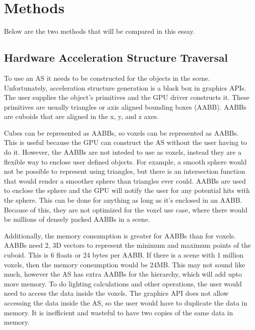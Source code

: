 \documentclass[12pt]{article}
\begin{document}

\section{Methods}

Below are the two methods that will be compared in this essay.

\subsection{Hardware Acceleration Structure Traversal}

To use an AS it needs to be constructed for the objects in the scene.
Unfortunately, acceleration structure generation is a black box in graphics APIs. 
The user supplies the object's primitives and the GPU driver constructs it.
These primitives are usually triangles or axis aligned bounding boxes (AABB).
AABBs are cuboids that are aligned in the x, y, and z axes.

Cubes can be represented as AABBs, so voxels can be represented as AABBs.
This is useful because the GPU can construct the AS without the user having to do it.
However, the AABBs are not inteded to use as voxels, instead they are a flexible way to enclose user defined objects.
For example, a smooth sphere would not be possible to represent using triangles, but there 
is an intersection function that would render a smoother sphere than triangles ever could.
AABBs are used to enclose the sphere and the GPU will notify the user for any potential hits with the sphere.
This can be done for anything as long as it's enclosed in an AABB.
Because of this, they are not optimized for the voxel use case, where there would be millions of
densely packed AABBs in a scene.

Additionally, the memory consumption is greater for AABBs than for voxels.
AABBs need 2, 3D vectors to represent the minimum and maximum points of the cuboid.
This is 6 floats or 24 bytes per AABB.
If there is a scene with 1 million voxels, then the memory consumption would be 24MB.
This may not sound like much, however the AS has extra AABBs for the hierarchy, which will add upto more memory.
To do lighting calculations and other operations, the user would need to access the data inside the voxels.
The graphics API does not allow accessing the data inside the AS, so the user would have to duplicate the data in memory.
It is inefficient and wasteful to have two copies of the same data in memory.
\end{document}
